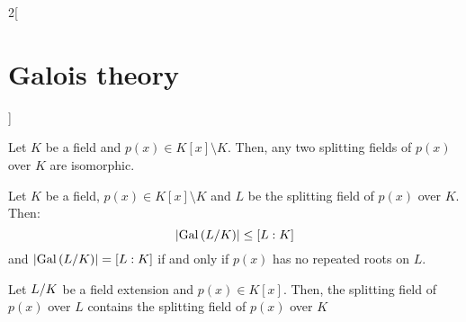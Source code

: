 \documentclass[../../../main.tex]{subfiles}
\begin{document}
\begin{multicols}{2}[\section{Galois theory}]
\begin{theorem}
  \end{theorem}
  \begin{corollary}
    Let $K$ be a field and $p(x)\in K[x]\setminus K$. Then, any two splitting fields of $p(x)$ over $K$ are isomorphic.
  \end{corollary}
  \begin{corollary}
    Let $K$ be a field, $p(x)\in K[x]\setminus K$ and $L$ be the splitting field of $p(x)$ over $K$. Then: $$\textstyle\left|\Gal\left(\quot{L}{K}\right)\right|\leq[L:K]$$ and $\left|\Gal\left(\quot{L}{K}\right)\right|=[L:K]$ if and only if $p(x)$ has no repeated roots on $L$.
  \end{corollary}
  \begin{corollary}
    Let $\quot{L}{K}$ be a field extension and $p(x)\in K[x]$. Then, the splitting field of $p(x)$ over $L$ contains the splitting field of $p(x)$ over $K$
  \end{corollary}

\end{multicols}
\end{document}
